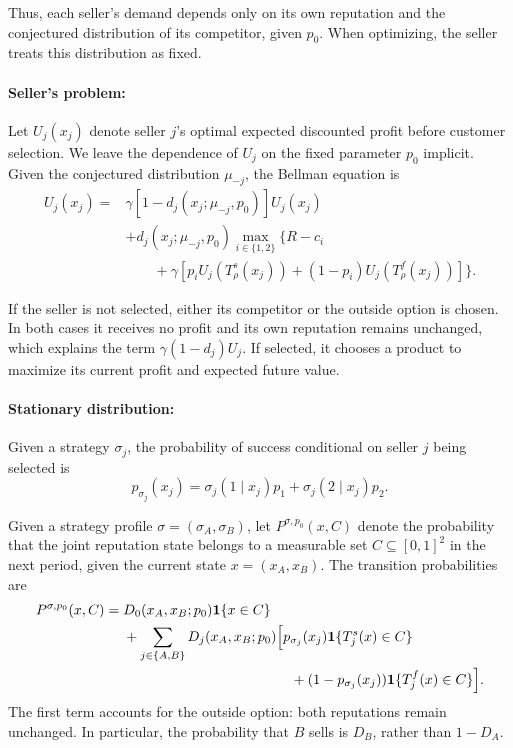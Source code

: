 \documentclass[11pt]{article}
\begin{document}
Thus, each seller's demand depends only on its own reputation
and the conjectured distribution of its competitor, given $p_0$.
When optimizing, the seller treats this distribution as fixed.

\paragraph{Seller's problem:}
Let $U_j(x_j)$ denote seller $j$'s optimal expected discounted
profit before customer selection. We leave the dependence of $U_j$
on the fixed parameter $p_0$ implicit. Given the conjectured distribution
$\mu_{-j}$, the Bellman equation is
\begin{equation}
\begin{aligned}
U_j(x_j) ={}& \gamma[1-d_j(x_j;\mu_{-j},p_0)]U_j(x_j)\\
&+d_j(x_j;\mu_{-j},p_0)
\max_{i\in\{1,2\}}\Big\{ R-c_i\\
&\qquad+\gamma\left[ p_i U_j(T_\rho^s(x_j)) + (1-p_i)U_j(T_\rho^f(x_j))
\right] \Big\}.
\end{aligned}
\end{equation}

If the seller is not selected, either its competitor or the outside option
is chosen. In both cases it receives no profit and its own reputation
remains unchanged, which explains the term $\gamma(1-d_j)U_j$.
If selected, it chooses a product to maximize its current profit and
expected future value.

\paragraph{Stationary distribution:}
Given a strategy $\sigma_j$, the probability of success conditional on
seller $j$ being selected is
\begin{equation}
p_{\sigma_j}(x_j) = \sigma_j(1\mid x_j)p_1 + \sigma_j(2\mid x_j)p_2.
\end{equation}

Given a strategy profile $\sigma=(\sigma_A,\sigma_B)$,
let $P^{\sigma,p_0}(x,C)$ denote the probability that the
joint reputation state belongs to a measurable set
$C\subseteq[0,1]^2$ in the next period, given the
current state $x=(x_A,x_B)$. The transition probabilities are
\begin{equation}
\begin{aligned}
P^{\sigma,p_0}(x,C)
={}&D_0(x_A,x_B;p_0)\mathbf{1}\{x\in C\}\\
&+\sum_{j\in\{A,B\}}D_j(x_A,x_B;p_0)
\Big[p_{\sigma_j}(x_j)\mathbf{1}\{T_j^s(x)\in C\}\\
&\hspace{42mm}+(1-p_{\sigma_j}(x_j))
\mathbf{1}\{T_j^f(x)\in C\}\Big].
\end{aligned}
\end{equation}
The first term accounts for the outside option: both reputations remain
unchanged. In particular, the probability that $B$ sells is $D_B$, rather
than $1-D_A$.
\end{document}
